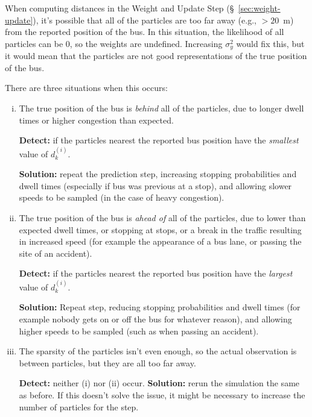 \documentclass[10pt,a4paper]{article}
\begin{document}
When computing distances in the Weight and Update Step (\S~\ref{sec:weight-update}),
it's possible that all of the particles are too far away (e.g., $>20$~m) from the 
reported position of the bus. In this situation, the likelihood of all particles
can be 0, so the weights are undefined. 
Increasing $\sigma_y^2$ would fix this, but it would mean that the particles are not 
good representations of the true position of the bus.



There are three situations when this occurs:
\begin{enumerate}[(i)]
\item 
  The true position of the bus is \emph{behind} all of the particles, due to longer dwell times
  or higher congestion than expected.

  \textbf{Detect:} if the particles nearest the reported bus position have the \emph{smallest}
  value of $d_k^{(i)}$.

  \textbf{Solution:} repeat the prediction step, increasing stopping probabilities and dwell times
  (especially if bus was previous at a stop),
  and allowing slower speeds to be sampled (in the case of heavy congestion).

\item 
  The true position of the bus is \emph{ahead of} all of the particles, due to lower than expected dwell
  times, or stopping at stops, or a break in the traffic resulting in increased speed (for example the
  appearance of a bus lane, or passing the site of an accident).

  \textbf{Detect:} if the particles nearest the reported bus position have the \emph{largest}
  value of $d_k^{(i)}$.

  \textbf{Solution:} Repeat step, reducing stopping probabilities and dwell times (for example nobody gets on or off 
  the bus for whatever reason), 
  and allowing higher speeds to be sampled (such as when passing an accident).

\item 
  The sparsity of the particles isn't even enough, so the actual observation is between particles, but they 
  are all too far away.

  \textbf{Detect:} neither (i) nor (ii) occur.
\label{fig:delta-distance-time-2}
  \textbf{Solution:} rerun the simulation the same as before. If this doesn't solve the issue, it might be necessary
  to increase the number of particles for the step.
\end{enumerate}
\end{document}
